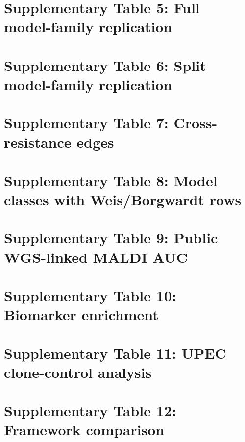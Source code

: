 \documentclass[11pt]{article}
\begin{document}


\section*{Supplementary Table 5: Full model-family replication}



\section*{Supplementary Table 6: Split model-family replication}



\section*{Supplementary Table 7: Cross-resistance edges}



\section*{Supplementary Table 8: Model classes with Weis/Borgwardt rows}



\section*{Supplementary Table 9: Public WGS-linked MALDI AUC}



\section*{Supplementary Table 10: Biomarker enrichment}



\section*{Supplementary Table 11: UPEC clone-control analysis}



\section*{Supplementary Table 12: Framework comparison}
\end{document}
